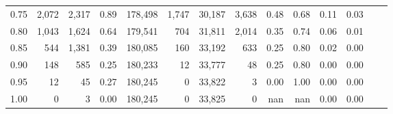 \begin{tabular}{rrrrrrrrrrrrrr}
0.75 &   2,072 &  2,317 &    0.89 &  178,498 &    1,747 &  30,187 &   3,638 &  0.48 &  0.68 &  0.11 &      0.03 \\
0.80 &   1,043 &  1,624 &    0.64 &  179,541 &      704 &  31,811 &   2,014 &  0.35 &  0.74 &  0.06 &      0.01 \\
0.85 &     544 &  1,381 &    0.39 &  180,085 &      160 &  33,192 &     633 &  0.25 &  0.80 &  0.02 &      0.00 \\
0.90 &     148 &    585 &    0.25 &  180,233 &       12 &  33,777 &      48 &  0.25 &  0.80 &  0.00 &      0.00 \\
0.95 &      12 &     45 &    0.27 &  180,245 &        0 &  33,822 &       3 &  0.00 &  1.00 &  0.00 &      0.00 \\
1.00 &       0 &      3 &    0.00 &  180,245 &        0 &  33,825 &       0 &   nan &   nan &  0.00 &      0.00 \\
\bottomrule
\end{tabular}
